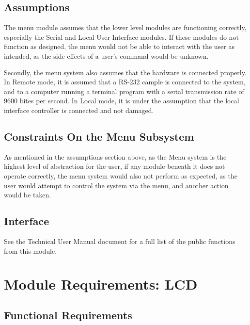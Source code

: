 \documentclass[]{report}
\begin{document}
\subsection{Assumptions}
The menu module assumes that the lower level modules are functioning correctly, especially the Serial and Local User Interface modules. If these modules do not function as designed, the menu would not be able to interact with the user as intended, as the side effects of a user's command would be unknown.

Secondly, the menu system also assumes that the hardware is connected properly. In Remote mode, it is assumed that a RS-232 cample is connected to the system, and to a computer running a terminal program with a serial transmission rate of 9600 bites per second. In Local mode, it is under the assumption that the local interface controller is connected and not damaged.

\subsection{Constraints On the Menu Subsystem}
As mentioned in the assumptions section above, as the Menu system is the highest level of abstraction for the user, if any module beneath it does not operate correctly, the menu system would also not perform as expected, as the user would attempt to control the system via the menu, and another action would be taken.

\subsection{Interface}
See the Technical User Manual document for a full list of the public functions from this module.

\section{Module Requirements: LCD}
\subsection{Functional Requirements}
\end{document}
